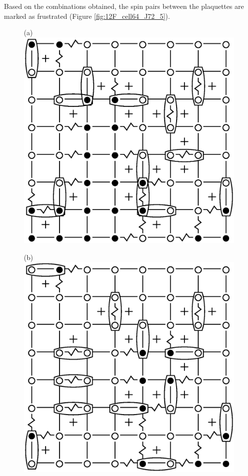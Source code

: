 \documentclass[preprint,12pt]{elsarticle}
\begin{document}
	Based on the combinations obtained, the spin pairs between the plaquettes are marked as frustrated (Figure \ref{fig:12F_cell64_J72_5}).
	
	\begin{figure}[H]
		\centering
		\begin{minipage}[h]{0.3\linewidth}
			\centering(a)
			\includegraphics[width=1\linewidth]{pictures/1Conf_cell64_J72_5.eps}
		\end{minipage}
		\hspace{15pt}
		\begin{minipage}[h]{0.3\linewidth}
			\centering(b)
			\includegraphics[width=1\linewidth]{pictures/2Conf_cell64_J72_5.eps}

\end{minipage}
\end{figure}
\end{document}
